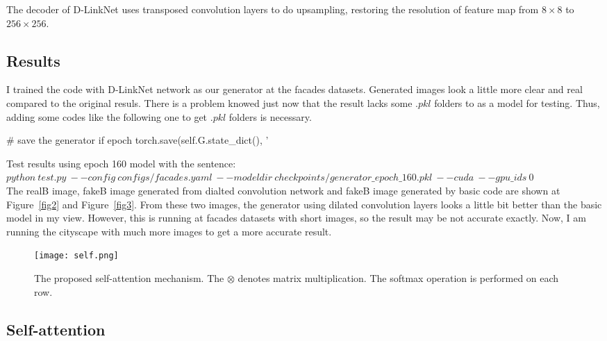 \documentclass[a4paper]{article}
\begin{document}
The decoder of D-LinkNet uses transposed convolution layers to do upsampling, restoring the resolution of feature map from $8\times 8$ to $256\times 256$.

\subsection{Results}

I trained the code with D-LinkNet network as our generator at the facades datasets. Generated images look a little more clear and real compared to the original resuls. There is a problem knowed just now that the result lacks some $.pkl$ folders to as a model for testing. Thus, adding some codes like the following one to get $.pkl$ folders is necessary. \\
\begin{python}
# save the generator
if epoch %
    torch.save(self.G.state_dict(), '%
\end{python}

Test results using epoch 160 model with the sentence:\\
$python~test.py~--config~configs/facades.yaml~--modeldir~checkpoints/generator\_epoch\_160.pkl~--cuda~--gpu\_ids~0$ \\

The realB image, fakeB image generated from dialted convolution network and fakeB image generated by basic code are shown at Figure~\ref{fig2} and Figure~\ref{fig3}. From these two images, the generator using dilated convolution layers looks a little bit better than the basic model in my view. However, this is running at facades datasets with short images, so the result may be not accurate exactly. Now, I am running the cityscape with much more images to get a more accurate result.

\begin{figure*}
\begin{center}
\texttt{[image: self.png]}
\end{center}
\caption{The proposed self-attention mechanism. The $\otimes$ denotes matrix multiplication. The softmax operation is performed on each row.
}
\label{fig4}
\end{figure*}

\subsection{Self-attention}
\end{document}
